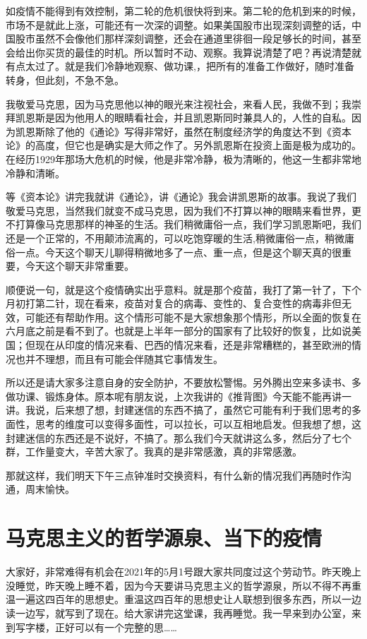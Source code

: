 \documentclass[UTF8, 12pt, a4paper]{ctexrep}
\begin{document}
如疫情不能得到有效控制，第二轮的危机很快将到来。第二轮的危机到来的时候，市场不是就此上涨，可能还有一次深的调整。如果美国股市出现深刻调整的话，中国股市虽然不会像他们那样深刻调整，还会在通道里徘徊一段足够长的时间，甚至会给出你买货的最佳的时机。所以暂时不动、观察。我算说清楚了吧？再说清楚就有点太过了。就是我们冷静地观察、做功课,，把所有的准备工作做好，随时准备转身，但此刻，不急不急。

我敬爱马克思，因为马克思他以神的眼光来注视社会，来看人民，我做不到；我崇拜凯恩斯是因为他用人的眼睛看社会，并且凯恩斯同时兼具人的，人性的自私。因为凯恩斯除了他的《通论》写得非常好，虽然在制度经济学的角度达不到《资本论》的高度，但它也是确实是大师之作了。另外凯恩斯在投资上面是极为成功的。在经历1929年那场大危机的时候，他是非常冷静，极为清晰的，他这一生都非常地冷静和清晰。

等《资本论》讲完我就讲《通论》，讲《通论》我会讲凯恩斯的故事。我说了我们敬爱马克思，当然我们就变不成马克思，因为我们不打算以神的眼睛来看世界，更不打算像马克思那样的神圣的生活。我们稍微庸俗一点，我们学习凯恩斯吧，我们还是一个正常的，不用颠沛流离的，可以吃饱穿暖的生活,稍微庸俗一点，稍微庸俗一点。今天这个聊天儿聊得稍微地多了一点、重一点，但是这个聊天真的很重要，今天这个聊天非常重要。

顺便说一句，就是这个疫情确实出乎意料。就是那个疫苗，我打了第一针了，下个月初打第二针，现在看来，疫苗对复合的病毒、变性的、复合变性的病毒非但无效，可能还有帮助作用。这个情形可能不是大家想象那个情形，所以全面的恢复在六月底之前是看不到了。也就是上半年一部分的国家有了比较好的恢复，比如说美国；但现在从印度的情况来看、巴西的情况来看，还是非常糟糕的，甚至欧洲的情况也并不理想，而且有可能会伴随其它事情发生。

所以还是请大家多注意自身的安全防护，不要放松警惕。另外腾出空来多读书、多做功课、锻炼身体。原本呢有朋友说，上次我讲的《推背图》今天能不能再讲一讲。我说，后来想了想，封建迷信的东西不搞了，虽然它可能有利于我们思考的多面性，思考的维度可以变得多面性，可以拉长，可以互相地启发。但我想了想，这封建迷信的东西还是不说好，不搞了。那么我们今天就讲这么多，然后分了七个群，工作量变大，辛苦大家了。我真的是非常感激，真的非常感激。

那就这样，我们明天下午三点钟准时交换资料，有什么新的情况我们再随时作沟通，周末愉快。

\section{马克思主义的哲学源泉、当下的疫情}

大家好，非常难得有机会在2021年的5月1号跟大家共同度过这个劳动节。昨天晚上没睡觉，昨天晚上睡不着，因为今天要讲马克思主义的哲学源泉，所以不得不再重温一遍这四百年的思想史。重温这四百年的思想史让人联想到很多东西，所以一边读一边写，就写到了现在。给大家讲完这堂课，我再睡觉。我一早来到办公室，来到写字楼，正好可以有一个完整的思……
\end{document}
